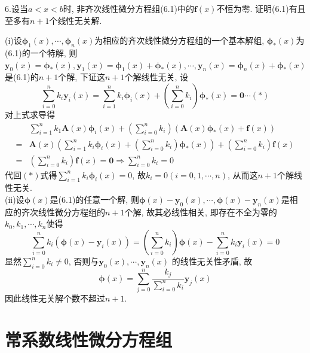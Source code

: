 \documentclass[titlepage,11pt,a4paper,twoside]{report}
\makeatletter
\renewenvironment{proof}{\par
	\pushQED{\qed}%
	\normalfont \topsep1\p@\@plus6\p@\relax
	\trivlist
	\item\relax
	{\hspace*{\parindent}{\heiti 证明}\@addpunct{:}}\hspace\labelsep\ignorespaces
}{%
	\popQED\endtrivlist\@endpefalse
}
\makeatother
\begin{document}
6.设当$a<x<b$时, 非齐次线性微分方程组(6.1)中的$\bm{f}(x)$不恒为零. 证明(6.1)有且至多有$n+1$个线性无关解.
\begin{proof}
(i)设$\bm{\phi}_1(x),\cdots,\bm{\phi}_n(x)$为相应的齐次线性微分方程组的一个基本解组, $\bm{\phi}_*(x)$为(6.1)的一个特解, 则$\bm{y}_0(x)=\bm{\phi}_*(x),\bm{y}_1(x)=\bm{\phi}_1(x)+\bm{\phi}_*(x),\cdots,\bm{y}_n(x)=\bm{\phi}_n(x)+\bm{\phi}_*(x)$是(6.1)的$n+1$个解, 下证这$n+1$个解线性无关, 设
\[\sum_{i=0}^nk_i\bm{y}_i(x)=\sum_{i=1}^nk_i\bm{\phi}_i(x)+\left(\sum_{i=0}^nk_i\right)\bm{\phi}_*(x)=\bm{0}\cdots(*)\]
对上式求导得
\[\begin{split}
&\sum_{i=1}^nk_1\bm{A}(x)\bm{\phi}_i(x)+\left(\sum_{i=0}^nk_i\right)\left(\bm{A}(x)\bm{\phi}_*(x)+\bm{f}(x)\right)\\
=&\bm{A}(x)\left(\sum_{i=1}^nk_i\bm{\phi}_i(x)+\left(\sum_{i=0}^nk_i\right)\bm{\phi}_*(x)\right)+\left(\sum_{i=0}^nk_i\right)\bm{f}(x)\\
=&\left(\sum_{i=0}^nk_i\right)\bm{f}(x)=\bm{0}\Rightarrow\sum_{i=0}^nk_i=0
\end{split}\]
代回$(*)$式得$\sum_{i=1}^nk_i\bm{\phi}_i(x)=0$, 故$k_i=0(i=0,1,\cdots,n)$, 从而这$n+1$个解线性无关.\\
(ii)设$\bm{\phi}(x)$是(6.1)的任意一个解, 则$\bm{\phi}(x)-\bm{y}_0(x),\cdots,\bm{\phi}(x)-\bm{y}_n(x)$是相应的齐次线性微分方程组的$n+1$个解, 故其必线性相关, 即存在不全为零的$k_0,k_1,\cdots,k_n$使得
\[\sum_{i=0}^nk_i(\bm{\phi}(x)-\bm{y}_i(x))=\left(\sum_{i=0}^nk_i\right)\bm{\phi}(x)-\sum_{i=0}^nk_i\bm{y}_i(x)=0\]
显然$\sum_{i=0}^nk_i\neq0$, 否则与$\bm{y}_0(x),\cdots,\bm{y}_n(x)$ 的线性无关性矛盾, 故
\[\bm{\phi}(x)=\sum_{j=0}^n\frac{k_j}{\sum_{i=0}^nk_i}\bm{y}_j(x)\]
因此线性无关解个数不超过$n+1$.
\end{proof}
\section{常系数线性微分方程组}
\end{document}
